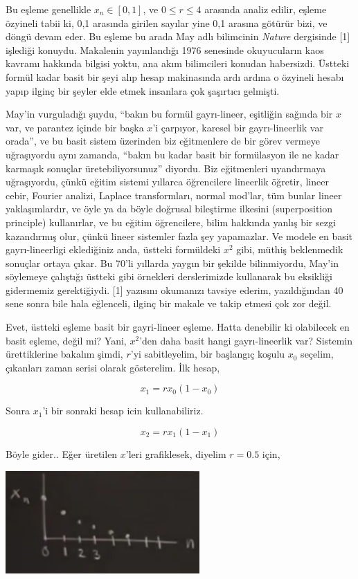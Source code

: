 \documentclass[12pt,fleqn]{article}\usepackage{../../common}
\begin{document}
Bu eşleme genellikle $x_n \in [0,1]$, ve $0 \le r \le 4$ arasında analiz
edilir, eşleme özyineli tabii ki, 0,1 arasında girilen sayılar yine 0,1
arasına götürür bizi, ve döngü devam eder. Bu eşleme bu arada May adlı
bilimcinin {\em Nature} dergisinde [1] işlediği konuydu. Makalenin
yayınlandığı 1976 senesinde okuyucuların kaos kavramı hakkında bilgisi
yoktu, ana akım bilimcileri konudan habersizdi. Üstteki formül kadar basit
bir şeyi alıp hesap makinasında ardı ardına o özyineli hesabı yapıp ilginç
bir şeyler elde etmek insanlara çok şaşırtıcı gelmişti.

May'in vurguladığı şuydu, ``bakın bu formül gayrı-lineer, eşitliğin sağında
bir $x$ var, ve parantez içinde bir başka $x$'i çarpıyor, karesel bir
gayrı-lineerlik var orada'', ve bu basit sistem üzerinden biz eğitmenlere
de bir görev vermeye uğraşıyordu aynı zamanda, ``bakın bu kadar basit bir
formülasyon ile ne kadar karmaşık sonuçlar üretebiliyorsunuz'' diyordu. Biz
eğitmenleri uyandırmaya uğraşıyordu, çünkü eğitim sistemi yıllarca
öğrencilere lineerlik öğretir, lineer cebir, Fourier analizi, Laplace
transformları, normal mod'lar, tüm bunlar lineer yaklaşımlardır, ve öyle ya
da böyle doğrusal bileştirme ilkesini (superposition principle)
kullanırlar, ve bu eğitim öğrencilere, bilim hakkında yanlış bir sezgi
kazandırmış olur, çünkü lineer sistemler fazla şey yapamazlar. Ve modele en
basit gayrı-lineerligi eklediğiniz anda, üstteki formüldeki $x^2$ gibi,
müthiş beklenmedik sonuçlar ortaya çıkar. Bu 70'li yıllarda yaygın bir
şekilde bilinmiyordu, May'in söylemeye çalıştığı üstteki gibi örnekleri
derslerimizde kullanarak bu eksikliği gidermemiz gerektiğiydi. [1] yazısını
okumanızı tavsiye ederim, yazıldığından 40 sene sonra bile hala eğlenceli,
ilginç bir makale ve takip etmesi çok zor değil.

Evet, üstteki eşleme basit bir gayri-lineer eşleme. Hatta denebilir ki
olabilecek en basit eşleme, değil mi? Yani, $x^2$'den daha basit hangi
gayrı-lineerlik var? Sistemin ürettiklerine bakalım şimdi, $r$'yi
sabitleyelim, bir başlangıç koşulu $x_0$ seçelim,  çıkanları zaman serisi
olarak gösterelim. İlk hesap,

$$ x_1 =  r x_0 (1-x_0) $$

Sonra $x_1$'i bir sonraki hesap icin kullanabiliriz. 

$$ x_2 = r x_1 (1-x_1) $$

Böyle gider.. Eğer üretilen $x$'leri grafiklesek, diyelim $r=0.5$ için,

\includegraphics[width=20em]{19_02.png}
\end{document}
